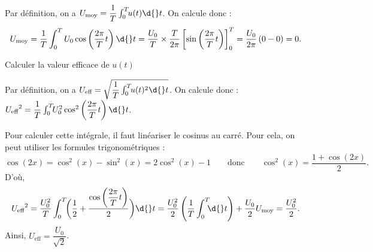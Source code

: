 
\begin{corrige}
Par définition, on a $U_{\text{moy}}=\dfrac{1}{T}\int_0^T\!\!u(t)\d{}t$. On calcule donc : 
\begin{equation*}
U_{\text{moy}}=\dfrac{1}{T}\int_0^TU_0\cos\left(\dfrac{2\pi}{T}t\right)\d{}t=\dfrac{U_0}{T}\times\dfrac{T}{2\pi}\left[\sin\left(\dfrac{2\pi}{T}t\right)\right]_0^T=\dfrac{U_0}{2\pi}\left(0-0\right)=0.
\end{equation*}
\end{corrige}



\begin{enonce}
Calculer la valeur efficace de $u(t)$
\end{enonce}



\begin{corrige}
Par définition, on a $U_{\textrm{eff}}=\sqrt{\dfrac{1}{T}\int_0^T \!\!u(t)^2\d{}t}$.
On calcule donc : ${U_{\textrm{eff}}}^2=\dfrac{1}{T}\int_0^T\!\!U_0^2\cos^2\left(\dfrac{2\pi}{T}t\right)\d{}t$.

Pour calculer cette intégrale, il faut linéariser le cosinus au carré. Pour cela, on peut utiliser les formules trigonométriques : 
\begin{equation*}
\cos(2x)=\cos^2(x)-\sin^2(x)=2\cos^2(x)-1\qquad\text{donc}\qquad\cos^2(x)=\dfrac{1+\cos(2x)}{2}.
\end{equation*}
D'où,
\[
{U_\textrm{eff}}^2=\dfrac{U_0^2}{T}\int_0^T\!\!\bigg(\dfrac{1}{2}+\dfrac{\cos\left(\dfrac{2\pi}{T}t\right)}{2}\bigg)\d{}t=
\dfrac{U_0^2}{2}\left(\dfrac{1}{T}\int_0^T\!\!\!\d{}t\right) + \frac{U_0}{2}U_{\text{moy}}=\dfrac{U_0^2}{2}.
\]
Ainsi, $U_\textrm{eff}=\dfrac{U_0}{\sqrt{2}}$.
\end{corrige}

\finEntrainement


\newpage





